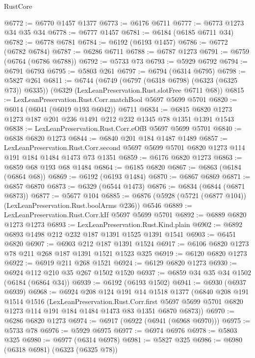 \begin{lexlean}{RustCore}
\begin{coremodule}
@6772 := @6770 @1457 @1377
@6773 := @6176 @6711
@6777 := @6773 @1273 @34 @35 @34
@6778 := @6777 @1457
@6781 := @6184 (@6185 @6711 @34)
@6782 := @6778 @6781
@6784 := @6192 (@6193 @1457)
@6786 := @6772 (@6782 @6784)
@6787 := @6286 @6711
@6788 := @6787 @1273
@6791 := @6759 (@6764 (@6786 @6788))
@6792 := @5733 @73
@6793 := @5929 @6792
@6794 := @6791 @6793
@6795 := @5803 @261
@6797 := @6794 (@6314 @6795)
@6798 := @5827 @261
@6811 := @6744
    (@6749 (@6797 (@6318 @6798) (@6323 (@6325 @73)) @6335))
    (@6329 (LexLeanPreservation.Rust.slotFree @6711 @68))
@6815 := LexLeanPreservation.Rust.Corr.matchBool @5697 @5699 @5701
@6820 := @6014 (@6041 (@6019 @193 @6042)) @6711
@6834 := @6815 @6820 @1273 @1273 @187 @201 @236 @1491 @212 @232 @1345 @78 @1351 @1391 @1543
@6838 := LexLeanPreservation.Rust.Corr.eOfB @5697 @5699 @5701
@6840 := @6838 @6820 @1273
@6844 := @6840 @201 @184 @1487 @1489
@6857 := LexLeanPreservation.Rust.Corr.second
    @5697
    @5699
    @5701
    @6820
    @1273
    @114
    @191
    @184
    @1484
    @1473
    @73
    @1351
@6859 := @6176 @6820 @1273
@6863 := @6859 @68 @193 @68 @1484
@6864 := @6185 @6820
@6867 := @6863 (@6184 (@6864 @68))
@6869 := @6192 (@6193 @1484)
@6870 := @6867 @6869
@6871 := @6857 @6870
@6873 := @6329 (@6544 @1473)
@6876 := @6834 (@6844 (@6871 @6873))
@6877 := @5677 @104
@6885 := @6876 (@5928 (@5721 (@6877 @104)) (LexLeanPreservation.Rust.boolArms @236)) @6546
@6889 := LexLeanPreservation.Rust.Corr.kIf @5697 @5699 @5701
@6892 := @6889 @6820 @1273 @1273
@6893 := LexLeanPreservation.Rust.Kind.plain
@6902 := @6892 @6893 @1498 @212 @232 @187 @1391 @1525 @1391 @1541
@6903 := @6451 @6820
@6907 := @6903 @212 @187 @1391 @1524
@6917 := @6106 @6820 @1273 @78 @211 @268 @187 @1391 @1521 @1523 @325
@6919 := @6120 @6820 @1273
@6922 := @6919 @211 @268 @1521
@6924 := @6129 @6820 @1273
@6930 := @6924 @112 @210 @35 @267 @1502 @1520
@6937 := @6859 @34 @35 @34 @1502 (@6184 (@6864 @34))
@6939 := @6192 (@6193 @1502)
@6941 := @6930 (@6937 @6939)
@6968 := @6924
    @208
    @124
    @191
    @14
    @1518
    @1377
    (@6840
      @208
      @191
      @1514
      @1516
      (LexLeanPreservation.Rust.Corr.first
        @5697
        @5699
        @5701
        @6820
        @1273
        @114
        @191
        @184
        @1484
        @1473
        @83
        @1351
        @6870
        @6873))
@6970 := @6286 @6820 @1273
@6974 := @6917 (@6922 (@6941 (@6968 @6970)))
@6975 := @5733 @78
@6976 := @5929 @6975
@6977 := @6974 @6976
@6978 := @5803 @325
@6980 := @6977 (@6314 @6978)
@6981 := @5827 @325
@6986 := @6980 (@6318 @6981) (@6323 (@6325 @78))

\end{coremodule}
\end{lexlean}
